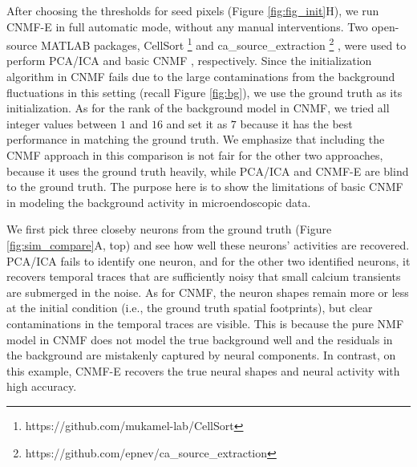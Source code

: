 \documentclass[9pt,lineno]{elife}
\begin{document}
After choosing the thresholds for seed pixels (Figure \ref{fig:fig_init}H), we run CNMF-E  in full automatic mode, without any manual interventions. Two open-source MATLAB packages, CellSort \footnote{https://github.com/mukamel-lab/CellSort} \citep{Mukamel2016code} and ca\_source\_extraction \footnote{https://github.com/epnev/ca\_source\_extraction} \citep{Pnevmatikakis2016code}, were used  to perform PCA/ICA \citep{Mukamel2009} and basic CNMF \citep{Pnevmatikakis2016}, respectively. Since the initialization algorithm in CNMF fails due to the large contaminations from the background fluctuations in this setting (recall Figure \ref{fig:bg}), we use the ground truth as its initialization. As for the rank of the background model in CNMF, we tried all integer values between $1$ and $16$ and set it as $7$ because it has the best performance in matching the ground truth. We emphasize that including the CNMF approach in this comparison is not fair for the other two approaches, because it uses the ground truth heavily, while PCA/ICA and CNMF-E are blind to the ground truth. The purpose here is to show the limitations of basic CNMF in modeling the background activity in microendoscopic data.

We first pick three closeby neurons from the ground truth (Figure \ref{fig:sim_compare}A, top) and see how well these neurons' activities are recovered. PCA/ICA fails to identify one neuron, and for the other two identified neurons, it recovers temporal traces that are sufficiently noisy that small calcium transients are submerged in the noise. As for CNMF, the neuron shapes remain more or less at the initial condition (i.e., the ground truth spatial footprints), but clear contaminations in the temporal traces are visible. This is because the pure NMF model in CNMF does not model the true background well and the residuals in the background are mistakenly captured by neural components. In contrast, on this example, CNMF-E recovers the true neural shapes and neural activity with high accuracy. %
\end{document}
